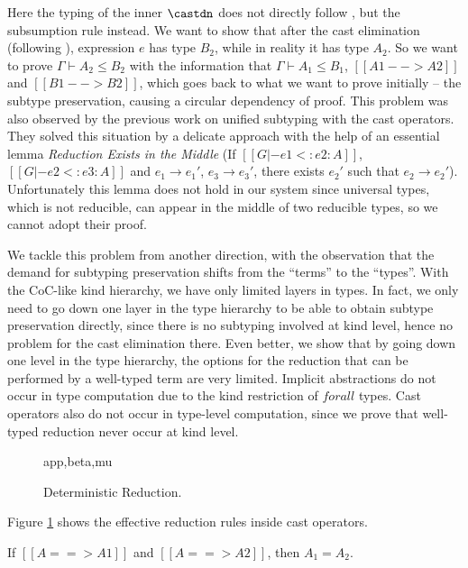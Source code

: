 Here the typing of the inner $\castdn$ does not directly follow
, but the subsumption rule instead. We want to show that after
the cast elimination (following ), expression $e$ has type $B_2$,
while in reality it has type $A_2$. So we want to prove $\Gamma \vdash A_2 \le B_2$
with the information that $\Gamma \vdash A_1 \le B_1$, $[[A1 --> A2]]$
and $[[B1 --> B2]]$, which goes back to what we want to prove initially --
the subtype preservation, causing a circular dependency of proof.
This problem was also observed by the previous work on unified subtyping
with the cast operators\cite{yang2017unifying}. They solved this situation
by a delicate approach with the help of an essential lemma
\emph{Reduction Exists in the Middle} (If $[[G |- e1 <: e2 : A]]$, $[[G |- e2 <: e3 : A]]$
and $e_1 \longrightarrow e_1'$, $e_3 \longrightarrow e_3'$, there exists $e_2'$
such that $e_2 \longrightarrow e_2'$). Unfortunately this lemma does not hold
in our system since universal types, which is not reducible, can appear in the middle of
two reducible types, so we cannot adopt their proof.

We tackle this problem from another direction, with the observation that the
demand for subtyping preservation shifts from the ``terms'' to the ``types''.
With the CoC-like kind hierarchy, we have only limited layers in types.
In fact, we only need to go down one layer in the type hierarchy to be able to
obtain subtype preservation directly, since there is no subtyping involved at kind level,
hence no problem for the cast elimination there.
Even better, we show that by going down one level in the type hierarchy, the options
for the reduction that can be performed by a well-typed term are very limited.
Implicit abstractions do not occur in type computation due to the kind
restriction of $forall$ types. Cast operators also do not occur in type-level computation,
since we prove that well-typed reduction never occur at kind level.

\begin{figure}
      {app,beta,mu}
    \caption{Deterministic Reduction.}
    \label{fig:deterministic-reduction}
\end{figure}

Figure \ref{fig:deterministic-reduction} shows the effective reduction rules
inside cast operators.

\begin{lemma}
    If $[[A ==> A1]]$ and $[[A ==> A2]]$,
    then $A_1 = A_2$.
\end{lemma}

